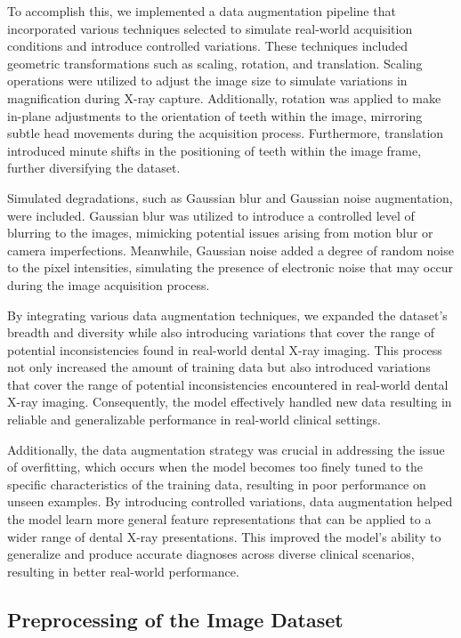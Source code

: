 \documentclass[journal,twoside,web]{ieeecolor}
\begin{document}
To accomplish this, we implemented a data augmentation pipeline that incorporated various techniques selected to simulate real-world acquisition conditions and introduce controlled variations.  These techniques included geometric transformations such as scaling, rotation, and translation. Scaling operations were utilized to adjust the image size to simulate variations in magnification during X-ray capture. Additionally, rotation was applied to make in-plane adjustments to the orientation of teeth within the image, mirroring subtle head movements during the acquisition process. Furthermore, translation introduced minute shifts in the positioning of teeth within the image frame, further diversifying the dataset.

Simulated degradations, such as Gaussian blur and Gaussian noise augmentation, were included. Gaussian blur was utilized to introduce a controlled level of blurring to the images, mimicking potential issues arising from motion blur or camera imperfections. Meanwhile, Gaussian noise added a degree of random noise to the pixel intensities, simulating the presence of electronic noise that may occur during the image acquisition process.

By integrating various data augmentation techniques, we expanded the dataset's breadth and diversity while also introducing variations that cover the range of potential inconsistencies found in real-world dental X-ray imaging. This process not only increased the amount of training data but also introduced variations that cover the range of potential inconsistencies encountered in real-world dental X-ray imaging. Consequently, the model effectively handled new data resulting in reliable and generalizable performance in real-world clinical settings.

Additionally, the data augmentation strategy was crucial in addressing the issue of overfitting, which occurs when the model becomes too finely tuned to the specific characteristics of the training data, resulting in poor performance on unseen examples. By introducing controlled variations, data augmentation helped the model learn more general feature representations that can be applied to a wider range of dental X-ray presentations. This improved the model's ability to generalize and produce accurate diagnoses across diverse clinical scenarios, resulting in better real-world performance.

\subsection{Preprocessing of the Image Dataset}
\end{document}
